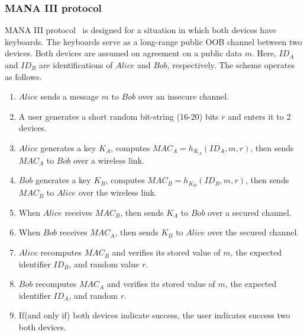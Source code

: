 \subsubsection*{MANA III protocol}

MANA III protocol~\cite{Mitchell:2004p25948} is designed for a situation in which both devices have keyboards. The keyboards serve as a long-range public OOB channel between two devices. Both devices are assumed on agreement on a public data $m$. Here, $ID_A$ and $ID_B$ are identifications of $Alice$ and $Bob$, respectively. The scheme operates as follows. 

\begin{enumerate}
\item $Alice$ sends a message $m$ to $Bob$ over an insecure channel. 
\item A user generates a short random bit-string (16-20) bits $r$ and enters it to 2 devices.
\item $Alice$ generates a key $K_A$, computes $MAC_A = h_{K_A}(ID_A,m,r)$, then sends $MAC_A$ to $Bob$ over a wireless link.
\item $Bob$ generates a key $K_B$, computes $MAC_B = h_{K_B}(ID_B,m,r)$, then sends $MAC_B$ to $Alice$ over the wireless link.
\item When $Alice$ receives $MAC_B$, then sends $K_A$ to $Bob$ over a secured channel.
\item When $Bob$ receives $MAC_A$, then sends $K_B$ to $Alice$ over the secured channel.
\item $Alice$ recomputes $MAC_B$ and verifies its stored value of $m$, the expected identifier $ID_B$, and random value $r$.
\item $Bob$ recomputes $MAC_A$ and verifies its stored value of $m$, the expected identifier $ID_A$, and random $r$.
\item If(and only if) both devices indicate success, the user indicates success two both devices.
\end{enumerate}


